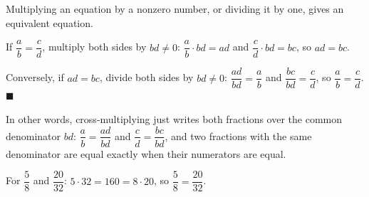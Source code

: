 Multiplying an equation by a nonzero number, or dividing it by one, gives an equivalent equation.

If $\dfrac {a}{b}=\dfrac {c}{d}$, multiply both sides by $bd\ne0$: $\dfrac {a}{b}\cdot bd=ad$ and $\dfrac {c}{d}\cdot bd=bc$, so $ad=bc$.

Conversely, if $ad=bc$, divide both sides by $bd\ne0$: $\dfrac{ad}{bd}=\dfrac {a}{b}$ and $\dfrac{bc}{bd}=\dfrac {c}{d}$, so $\dfrac {a}{b}=\dfrac {c}{d}$. $\blacksquare$

In other words, cross-multiplying just writes both fractions over the common denominator $bd$: $\dfrac {a}{b}=\dfrac{ad}{bd}$ and $\dfrac {c}{d}=\dfrac{bc}{bd}$, and two fractions with the same denominator are equal exactly when their numerators are equal.

For $\dfrac{5}{8}$ and $\dfrac{20}{32}$: $5\cdot32=160=8\cdot20$, so $\boxed{\dfrac{5}{8}=\dfrac{20}{32}}$.
